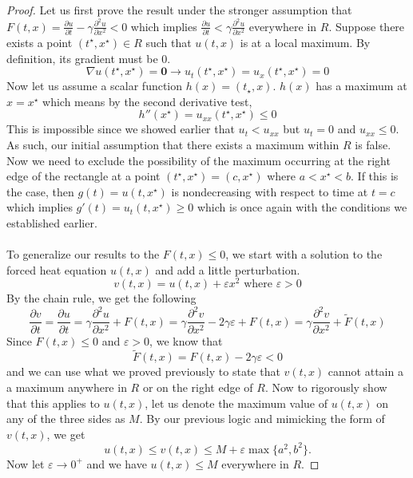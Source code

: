 \documentclass{article}
\newcommand{\pd}[2]{\frac{\partial #1}{\partial #2}}
\newcommand{\pdt}[2]{\frac{\partial ^2 #1}{\partial #2 ^2}}
\theoremstyle{definition}
\begin{document}
\begin{proof}
    Let us first prove the result under the stronger assumption that $F(t,x) = \pd{u}{t} -\gamma \pdt{u}{x} <0$ which implies $\pd{u}{t} < \gamma \pdt{u}{x}$ everywhere in $R$. Suppose there exists a point $(t^\star, x^\star) \in R$ such that $u(t,x)$ is at a local maximum. By definition, its gradient must be 0.
    \begin{equation*}
        \nabla u(t^\star, x^\star ) = \mathbf{0} \rightarrow u_t(t^\star,x^\star) = u_{x}(t^\star, x^\star) = 0
    \end{equation*}
    Now let us assume a scalar function $h(x) = (t_\star, x)$. $h(x)$ has a maximum at $x=x^\star$ which means by the second derivative test,
    \begin{equation*}
        h''(x^\star) = u_{xx}(t^\star, x^\star) \leq 0
    \end{equation*}
    This is impossible since we showed earlier that $u_t < u_{xx}$ but $u_t = 0$ and $u_{xx} \leq 0$. As such, our initial assumption that there exists a maximum within $R$ is false. Now we need to exclude the possibility of the maximum occurring at the right edge of the rectangle at a point $(t^\star,x^\star) = (c,x^\star)$ where $a<x^\star < b$. If this is the case, then $g(t) =u(t,x^\star)$ is nondecreasing with respect to time at $t=c$ which implies $g'(t) = u_t(t,x^\star) \geq 0$ which is once again with the conditions we established earlier. \\\\
    To generalize our results to the $F(t,x) \leq 0$, we start with a solution to the forced heat equation $u(t,x)$ and add a little perturbation.
    \begin{equation*}
        v(t,x) = u(t,x) + \varepsilon x^2 \text{ where } \varepsilon>0
    \end{equation*}
    By the chain rule, we get the following 
    \begin{equation*}
        \pd{v}{t} = \pd{u}{t} =\gamma \pdt{u}{x}+F(t,x) = \gamma \pdt{v}{x} -2\gamma \varepsilon+F(t,x) = \gamma \pdt{v}{x} +\tilde{F}(t,x)
    \end{equation*}
    Since $F(t,x) \leq 0$ and $\varepsilon>0$, we know that 
    \begin{equation*}
        \tilde{F}(t,x) = F(t,x) -2\gamma\varepsilon <0
    \end{equation*}
    and we can use what we proved previously to state that $v(t,x)$ cannot attain a a maximum anywhere in $R$ or on the right edge of $R$. Now to rigorously show that this applies to $u(t,x)$, let us denote the maximum value of $u(t,x)$ on any of the three sides as $M$. By our previous logic and mimicking the form of $v(t,x)$, we get
    \begin{equation*}
    u(t,x) \leq v(t,x) \leq M+\varepsilon \max \{a^2,b^2 \}.
    \end{equation*}
    Now let $\varepsilon\rightarrow 0^+$ and we have $u(t,x) \leq M$ everywhere in $R$.
    
\end{proof}
\end{document}
